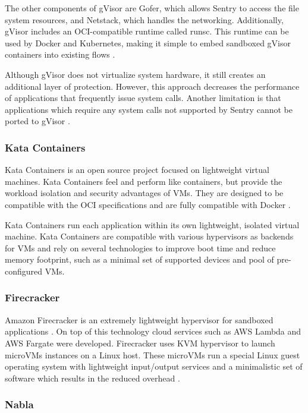 The other components of gVisor are Gofer, which allows Sentry to access the file system resources, and Netstack, which handles the networking. Additionally, gVisor includes an OCI-compatible runtime called runsc. This runtime can be used by Docker and Kubernetes, making it simple to embed sandboxed gVisor containers into existing flows \cite{gh:gvisor}.

Although gVisor does not virtualize system hardware, it still creates an additional layer of protection. However, this approach decreases the performance of applications that frequently issue system calls. Another limitation is that applications which require any system calls not supported by Sentry cannot be ported to gVisor \cite{c:4}.

\subsubsection*{Kata Containers}

Kata Containers is an open source project focused on lightweight virtual machines. Kata Containers feel and perform like containers, but provide the workload isolation and security advantages of VMs. They are designed to be compatible with the OCI specifications and are fully compatible with Docker \cite{c:11}.

Kata Containers run each application within its own lightweight, isolated virtual machine. Kata Containers are compatible with various hypervisors as backends for VMs and rely on several technologies to improve boot time and reduce memory footprint, such as a minimal set of supported devices and pool of pre-configured VMs.

\subsubsection*{Firecracker}

Amazon Firecracker is an extremely lightweight hypervisor for sandboxed applications \cite{spr:1}. On top of this technology cloud services such as AWS Lambda and AWS Fargate were developed. Firecracker uses KVM hypervisor to launch microVMs instances on a Linux host. These microVMs run a special Linux guest operating system with lightweight input/output services and a minimalistic set of software which results in the reduced overhead \cite{acm:3}.

\subsubsection*{Nabla}

